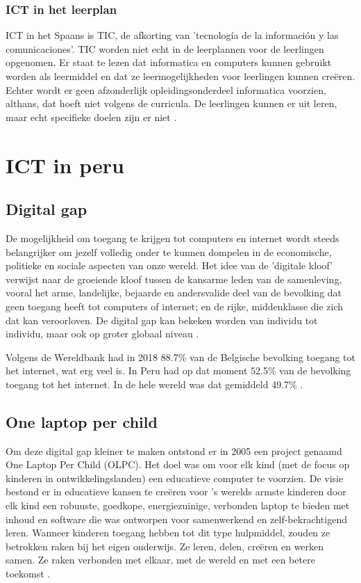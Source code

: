 \subsubsection{ICT in het leerplan}
ICT in het Spaans is TIC, de afkorting van 'tecnología de la información y las comunicaciones'. TIC worden niet echt in de leerplannen voor de leerlingen opgenomen. Er staat te lezen dat informatica en computers kunnen gebruikt worden als leermiddel en dat ze leermogelijkheden voor leerlingen kunnen creëren. Echter wordt er geen afzonderlijk opleidingsonderdeel informatica voorzien, althans, dat hoeft niet volgens de curricula. De leerlingen kunnen er uit leren, maar echt specifieke doelen zijn er niet \autocite{MINEDU2016}.

\section{ICT in peru}
\subsection{Digital gap}
De mogelijkheid om toegang te krijgen tot computers en internet wordt steeds belangrijker om jezelf volledig onder te kunnen dompelen in de economische, politieke en sociale aspecten van onze wereld. Het idee van de 'digitale kloof' verwijst naar de groeiende kloof tussen de kansarme leden van de samenleving, vooral het arme, landelijke, bejaarde en andersvalide deel van de bevolking dat geen toegang heeft tot computers of internet; en de rijke, middenklasse die  zich dat kan veroorloven. De digital gap kan bekeken worden van individu tot individu, maar ook op groter globaal niveau \autocite{Marichick2000}.

Volgens de Wereldbank had in 2018 88.7\% van de Belgische bevolking toegang tot het internet, wat erg veel is. In Peru had op dat moment 52.5\% van de bevolking toegang tot het internet. In de hele wereld was dat gemiddeld 49.7\% \autocite{WereldBank2018}.

\subsection{One laptop per child}
Om deze digital gap kleiner te maken ontstond er in 2005 een project genaamd One Laptop Per Child (OLPC). Het doel was om voor elk kind (met de focus op kinderen in ontwikkelingslanden) een educatieve computer te voorzien. De visie bestond er in educatieve kansen te creëren voor 's werelds armste kinderen door elk kind een robuuste, goedkope, energiezuinige, verbonden laptop te bieden met inhoud en software die was ontworpen voor samenwerkend en zelf-bekrachtigend leren. Wanneer kinderen toegang hebben tot dit type hulpmiddel, zouden ze betrokken raken bij het eigen onderwijs. Ze leren, delen, creëren en werken samen. Ze raken verbonden met elkaar, met de wereld en met een betere toekomst \autocite{OneLaptopPerChild2005}.

